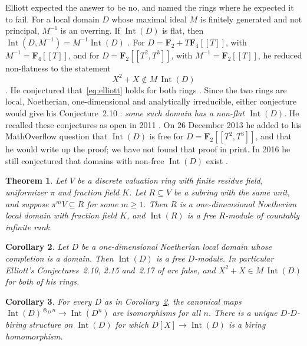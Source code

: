 \documentclass[11pt,a4paper]{article}
\theoremstyle{plain}
\newtheorem{theorem}{Theorem}
\newtheorem{corollary}[theorem]{Corollary}
\theoremstyle{remark}
\newcommand{\F}{\mathbf F}
\newcommand{\Int}{\operatorname{Int}}
\begin{document}
Elliott expected the answer to be no, and named the rings where he expected it to fail. For a local domain $D$ whose
maximal ideal $M$ is finitely generated and not principal, $M^{-1}$ is an overring. If $\Int(D)$ is flat, then
$\Int(D,M^{-1})=M^{-1}\Int(D)$ \cite[Proposition~2.13, p.~12]{E11a}. For $D=\F_2+T\F_4[[T]]$, with $M^{-1}=\F_4[[T]]$,
and for $D=\F_2[[T^2,T^3]]$, with $M^{-1}=\F_2[[T]]$, he reduced non-flatness to the statement
\begin{equation}\label{eq:elliott}
 X^2+X\notin M\,\Int(D)
\end{equation}
\cite[Propositions~2.14 and~2.16, p.~12]{E11a}. He conjectured that~\eqref{eq:elliott} holds for both rings
\cite[Conjectures~2.15 and~2.17]{E11a}. Since the two rings are local, Noetherian, one-dimensional and
analytically irreducible, either conjecture would give his Conjecture~2.10 \cite[p.~11]{E11a}: \emph{some such domain
has a non-flat $\Int(D)$}. He recalled these conjectures as open in 2011 \cite[p.~2]{E11b}. On 26 December 2013
he added to his MathOverflow question \cite{MO} that $\Int(D)$ is free for $D=\F_2[[T^2,T^3]]$, and that he would
write up the proof; we have not found that proof in print. In 2016 he still conjectured that domains with non-free
$\Int(D)$ exist \cite[p.~2]{E16b}.

\begin{theorem}\label{thm:main}
Let $V$ be a discrete valuation ring with finite residue field, uniformizer $\pi$ and fraction field $K$. Let
$R\subseteq V$ be a subring with the same unit, and suppose $\pi^mV\subseteq R$ for some $m\geq1$. Then $R$ is a
one-dimensional Noetherian local domain with fraction field $K$, and $\Int(R)$ is a free $R$-module of countably
infinite rank.
\end{theorem}

\begin{corollary}\label{cor:ai}
Let $D$ be a one-dimensional Noetherian local domain whose completion is a domain. Then $\Int(D)$ is a free
$D$-module. In particular Elliott's Conjectures~2.10, 2.15 and~2.17 of \cite{E11a} are false, and
$X^2+X\in M\,\Int(D)$ for both of his rings.
\end{corollary}

\begin{corollary}\label{cor:biring}
For every $D$ as in Corollary~\ref{cor:ai}, the canonical maps $\Int(D)^{\otimes_D n}\to\Int(D^n)$ are isomorphisms
for all $n$. There is a unique $D$-$D$-biring structure on $\Int(D)$ for which $D[X]\to\Int(D)$ is a biring
homomorphism.
\end{corollary}
\end{document}

